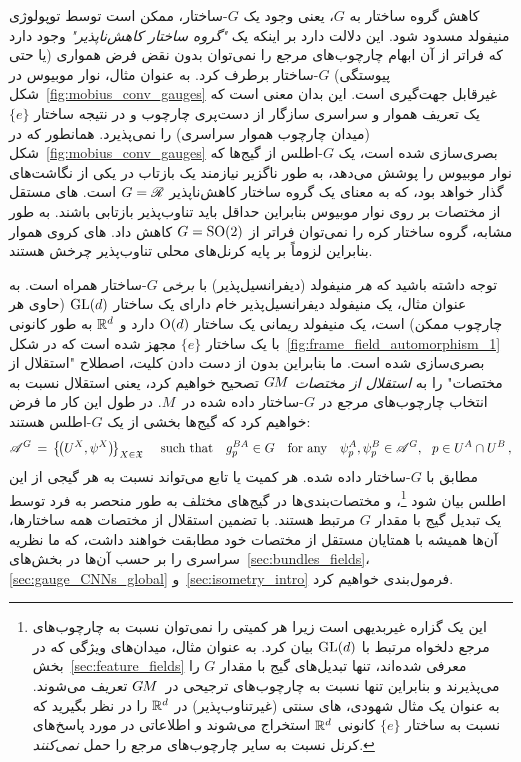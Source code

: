 کاهش گروه ساختار به $G$، یعنی وجود یک $G$-ساختار، ممکن است توسط توپولوژی منیفولد مسدود شود.
این دلالت دارد بر اینکه یک \emph{"گروه ساختار کاهش‌ناپذیر"} وجود دارد که فراتر از آن ابهام چارچوب‌های مرجع را نمی‌توان بدون نقض فرض همواری (یا حتی پیوستگی) $G$-ساختار برطرف کرد.
به عنوان مثال، نوار موبیوس در شکل~\ref{fig:mobius_conv_gauges} غیرقابل جهت‌گیری است. این بدان معنی است که یک تعریف هموار و سراسری سازگار از دست‌پری چارچوب و در نتیجه ساختار $\{e\}$ (میدان چارچوب هموار سراسری) را نمی‌پذیرد.
همانطور که در شکل~\ref{fig:mobius_conv_gauges} بصری‌سازی شده است، یک $G$-اطلس از گیج‌ها که نوار موبیوس را پوشش می‌دهد، به طور ناگزیر نیازمند یک بازتاب در یکی از نگاشت‌های گذار خواهد بود، که به معنای یک گروه ساختار کاهش‌ناپذیر $G=\mathscr{R}$ است.
\CNN{}های مستقل از مختصات بر روی نوار موبیوس بنابراین حداقل باید تناوب‌پذیر بازتابی باشند.
به طور مشابه، گروه ساختار کره را نمی‌توان فراتر از $G=\operatorname{SO}(2)$ کاهش داد.
\CNN{}های کروی هموار بنابراین لزوماً بر پایه کرنل‌های محلی تناوب‌پذیر چرخش هستند.


توجه داشته باشید که \emph{هر} منیفولد (دیفرانسیل‌پذیر) با \emph{برخی} $G$-ساختار همراه است.
به عنوان مثال، یک منیفولد دیفرانسیل‌پذیر خام دارای یک ساختار $\operatorname{GL}(d)$ (حاوی هر چارچوب ممکن) است، یک منیفولد ریمانی یک ساختار $\operatorname{O}(d)$ دارد و $\mathbb{R}^d$ به طور کانونی با یک ساختار $\{e\}$ مجهز شده است که در شکل~\ref{fig:frame_field_automorphism_1} بصری‌سازی شده است.
ما بنابراین بدون از دست دادن کلیت، اصطلاح "استقلال از مختصات" را به \emph{استقلال از مختصات} $G\mkern-1.4muM$ تصحیح خواهیم کرد، یعنی استقلال نسبت به انتخاب چارچوب‌های مرجع در $G$-ساختار داده شده در~$M$.
در طول این کار ما فرض خواهیم کرد که گیج‌ها بخشی از یک $G$-اطلس هستند:
\begin{align}\label{eq:G_atlas_dfn}
	\mathscr{A}^G \,=\, \big\{\! \big(U^X, \psi^X\big) \!\big\}_{X\in \mathfrak{X}}
	\quad\ \textup{such that} \quad
	g_p^{BA} \in G
	\quad \textup{for any}\ \ \ \psi_p^A, \psi_p^B \in \mathscr{A}^G,\ \ p\in U^A\cap U^B \,,
\end{align}
مطابق با $G$-ساختار داده شده.
هر کمیت یا تابع می‌تواند نسبت به هر گیجی از این اطلس بیان شود%
\footnote{
	این یک گزاره غیربدیهی است زیرا هر کمیتی را نمی‌توان نسبت به چارچوب‌های مرجع دلخواه مرتبط با $\operatorname{GL}(d)$ بیان کرد.
	به عنوان مثال، میدان‌های ویژگی که در بخش~\ref{sec:feature_fields} معرفی شده‌اند، تنها تبدیل‌های گیج با مقدار $G$ را می‌پذیرند و بنابراین تنها نسبت به چارچوب‌های ترجیحی در~$G\mkern-1.4muM$ تعریف می‌شوند.
	به عنوان یک مثال شهودی، \CNN{}های سنتی (غیرتناوب‌پذیر) در $\mathbb{R}^d$ را در نظر بگیرید که نسبت به ساختار $\{e\}$ کانونی $\mathbb{R}^d$ استخراج می‌شوند و اطلاعاتی در مورد پاسخ‌های کرنل نسبت به سایر چارچوب‌های مرجع را حمل \emph{نمی‌کنند}.
}،
و مختصات‌بندی‌ها در گیج‌های مختلف به طور منحصر به فرد توسط یک تبدیل گیج با مقدار $G$ مرتبط هستند.
با تضمین استقلال از مختصات همه ساختارها، آن‌ها همیشه با همتایان مستقل از مختصات خود مطابقت خواهند داشت، که ما نظریه سراسری را بر حسب آن‌ها در بخش‌های~\ref{sec:bundles_fields}، \ref{sec:gauge_CNNs_global} و~\ref{sec:isometry_intro} فرمول‌بندی خواهیم کرد.